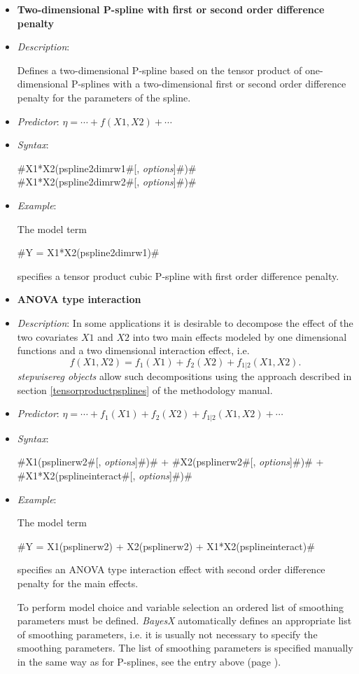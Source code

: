 \begin{itemize}
\item[]{\bf\sffamily Two-dimensional P-spline with first or second order difference penalty}

\item[] {\em Description}:

Defines a two-dimensional P-spline based on the tensor product of
one-dimensional P-splines with a two-dimensional first or second order
difference penalty for the parameters of the spline.
\item[] {\em
Predictor}: $\eta= \cdots + f(X1,X2) + \cdots$ \item[] {\em
Syntax}:

#X1*X2(pspline2dimrw1#[, {\em options}]#)# \\
#X1*X2(pspline2dimrw2#[, {\em options}]#)#
\item[] {\em Example}:

The model term

#Y = X1*X2(pspline2dimrw1)#

specifies a tensor product cubic P-spline with first order difference penalty.
\item[]{\bf\sffamily ANOVA type interaction}

\item[] {\em Description}:
In some applications it is desirable to decompose the effect of the two covariates
$X1$ and $X2$ into two main effects modeled by one dimensional functions and a two dimensional interaction effect, i.e.
\begin{equation}
\label{gampspline_2dimtermmain}
f \left(X1,X2\right) = f_1\left(X1 \right) +
f_2 \left(X2\right) + f_{1|2}\left(X1,X2 \right).
\end{equation}
{\em stepwisereg objects} allow such decompositions using the approach described in section
\autoref{tensorproductpsplines} of the methodology manual.
\item[] {\em
Predictor}: $\eta= \cdots + f_1(X1) + f_2(X2) + f_{1 | 2}(X1,X2) +  \cdots$
\item[] {\em Syntax}:

#X1(psplinerw2#[, {\em options}]#)# + #X2(psplinerw2#[, {\em options}]#)# + \\
#X1*X2(psplineinteract#[, {\em options}]#)#

\item[] {\em Example}:

The model term

#Y = X1(psplinerw2) + X2(psplinerw2) + X1*X2(psplineinteract)#

specifies an ANOVA type interaction effect with  second order difference penalty for the main effects.

To perform model choice and variable selection an ordered list of smoothing parameters must be defined. {\em BayesX} automatically defines an appropriate list of smoothing
parameters, i.e. it is usually not necessary to  specify the smoothing parameters. The list of smoothing parameters is
specified manually in the same way as for P-splines, see the entry above (page \pageref{psplines_stepwise}).
\end{itemize}



